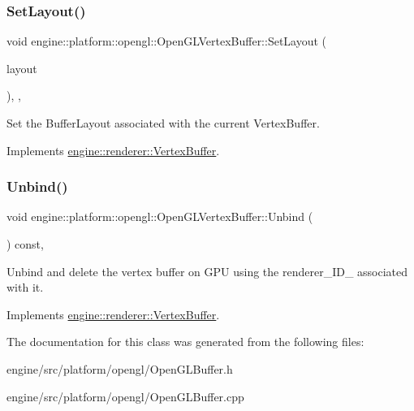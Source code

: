 \subsubsection{\texorpdfstring{Set\+Layout()}{SetLayout()}}
{\footnotesize\ttfamily void engine\+::platform\+::opengl\+::\+Open\+G\+L\+Vertex\+Buffer\+::\+Set\+Layout (\begin{DoxyParamCaption}\item[{const \hyperlink{classengine_1_1renderer_1_1BufferLayout}{renderer\+::\+Buffer\+Layout} \&}]{layout }\end{DoxyParamCaption})\hspace{0.3cm}{\ttfamily [inline]}, {\ttfamily [override]}, {\ttfamily [virtual]}}

Set the Buffer\+Layout associated with the current Vertex\+Buffer. 

Implements \hyperlink{classengine_1_1renderer_1_1VertexBuffer}{engine\+::renderer\+::\+Vertex\+Buffer}.

\mbox{\label{classengine_1_1platform_1_1opengl_1_1OpenGLVertexBuffer_a9069ca746c0de9dd9418ba9c5ee7b67b}} 
\subsubsection{\texorpdfstring{Unbind()}{Unbind()}}
{\footnotesize\ttfamily void engine\+::platform\+::opengl\+::\+Open\+G\+L\+Vertex\+Buffer\+::\+Unbind (\begin{DoxyParamCaption}{ }\end{DoxyParamCaption}) const\hspace{0.3cm}{\ttfamily [override]}, {\ttfamily [virtual]}}

Unbind and delete the vertex buffer on G\+PU using the renderer\+\_\+\+I\+D\+\_\+ associated with it. 

Implements \hyperlink{classengine_1_1renderer_1_1VertexBuffer}{engine\+::renderer\+::\+Vertex\+Buffer}.



The documentation for this class was generated from the following files\+:\begin{DoxyCompactItemize}
\item 
engine/src/platform/opengl/Open\+G\+L\+Buffer.\+h\item 
engine/src/platform/opengl/Open\+G\+L\+Buffer.\+cpp\end{DoxyCompactItemize}
